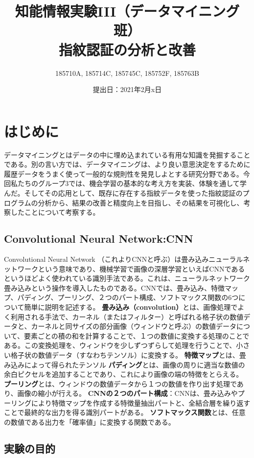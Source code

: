 \documentclass[a4paper, 11pt, titlepage]{jsarticle}
\title{知能情報実験III（データマイニング班）\\指紋認証の分析と改善}
\author{185710A, 185714C, 185745C, 185752F, 185763B}
\date{提出日：2021年2月x日}
\begin{document}
\maketitle
\tableofcontents
\clearpage


\section{はじめに}
データマイニングとはデータの中に埋め込まれている有用な知識を発掘することである。別の言い方では、データマイニングは、より良い意思決定をするために履歴データをうまく使って一般的な規則性を発見しよとする研究分野である。今回私たちのグループ3では、機会学習の基本的な考え方を実装、体験を通して学んだ。そしてその応用として、既存に存在する指紋データを使った指紋認証のプログラムの分析から、結果の改善と精度向上を目指し、その結果を可視化し、考察したことについて考察する。

\subsection{Convolutional Neural Network:CNN}
Convolutional Neural Network （これよりCNNと呼ぶ）は畳み込みニューラルネットワークという意味であり、機械学習で画像の深層学習といえばCNNであるというほどよく使われている識別手法である。これは、ニューラルネットワーク畳み込みという操作を導入したものである。CNNでは、畳み込み、特徴マップ、パディング、プーリング、２つのパート構成、ソフトマックス関数の6つについて簡単に説明を記述する。
\textbf{畳み込み（convolution）}とは、画像処理でよく利用される手法で、カーネル（またはフィルター）と呼ばれる格子状の数値データと、カーネルと同サイズの部分画像（ウィンドウと呼ぶ）の数値データについて、要素ごとの積の和を計算することで、１つの数値に変換する処理のことである。この変換処理を、ウィンドウを少しずつずらして処理を行うことで、小さい格子状の数値データ（すなわちテンソル）に変換する。
\textbf{特徴マップ}とは、畳み込みによって得られたテンソル
\textbf{パディング}とは、画像の周りに適当な数値の余白ピクセルを追加することであり、これにより画像の端の特徴をとらえる。
\textbf{プーリング}とは、ウィンドウの数値データから１つの数値を作り出す処理であり、画像の縮小が行える。
\textbf{ CNNの２つのパート構成}：CNNは、畳み込みやプーリングにより特徴マップを作成する特徴量抽出パートと、全結合層を繰り返すことで最終的な出力を得る識別パートがある。
\textbf{ソフトマックス関数}とは、任意の数値である出力を「確率値」に変換する関数である。

\subsection{実験の目的}
\end{document}
